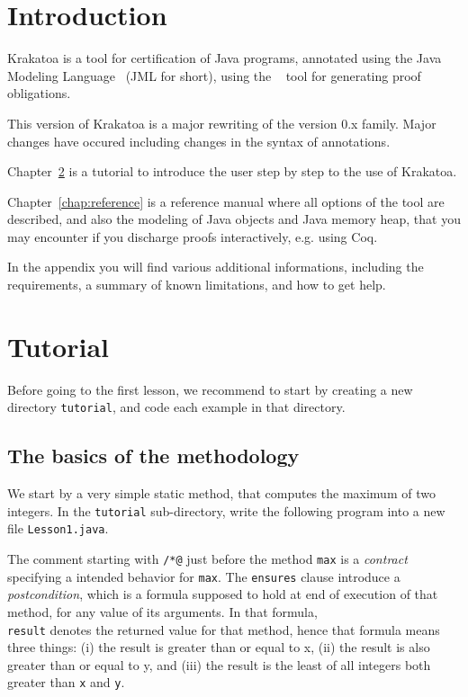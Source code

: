 \documentclass[a4paper,11pt,twoside,openright]{report}
\begin{document}
\sloppy
{}



\tableofcontents

\chapter{Introduction}

Krakatoa is a tool for certification of Java programs, annotated using
the Java Modeling Language~\cite{leavens00preliminary} (JML for
short), using the \Why{}~\cite{why} tool for generating proof
obligations.

This version \whyversion{} of Krakatoa is a major rewriting of  
the version 0.x family. Major changes have occured including changes in the syntax of annotations.

Chapter~\ref{chap:tutorial} is a tutorial to introduce the user step
by step to the use of Krakatoa. 

Chapter~\ref{chap:reference} is a reference manual where all options
of the tool are described, and also the modeling of Java objects and
Java memory heap, that you may encounter if you discharge proofs interactively, e.g. using Coq.

In the appendix you will find various additional informations,
including the requirements, a summary of known limitations, and how to
get help. 


\chapter{Tutorial}
\label{chap:tutorial}

Before going to the first lesson, we recommend to start by creating a new
directory \verb|tutorial|, and code each example in that directory. 

\section{The basics of the methodology}

We start by a very simple static method, that computes the maximum of
two integers. In the \verb|tutorial| sub-directory, write the
following \Java{} program 
into a new file \verb|Lesson1.java|.

The comment starting with \verb|/*@| just before the method
\texttt{max} is a \emph{contract} specifying a intended behavior for
\texttt{max}. 
The \texttt{ensures} clause introduce a
\emph{postcondition}, which is a formula supposed to hold at end of
execution of that method, for any value of its arguments. In that
formula, \texttt{\\result} denotes the returned value for that method,
hence that formula means three things: (i) the result is greater than or
equal to x, (ii) the result is also greater than or
equal to y, and (iii) the result is the least of all integers both
greater than \texttt{x} and \texttt{y}.
\end{document}
